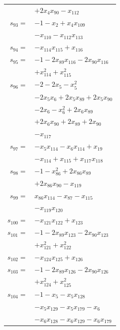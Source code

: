 \begin{longtable}{@{}r@{\;}l@{}}
 & \(\displaystyle +2x_{4}x_{90} -x_{112}\) \\[3pt]
\(s_{93}=\) & \(\displaystyle -1 -x_{2} +x_{4}x_{109}\) \\
 & \(\displaystyle -x_{110} -x_{112}x_{113}\) \\[3pt]
\(s_{94}=\) & \(\displaystyle -x_{114}x_{115} +x_{116}\) \\[3pt]
\(s_{95}=\) & \(\displaystyle -1 -2x_{89}x_{116} -2x_{90}x_{116}\) \\
 & \(\displaystyle +x_{114}^{2} +x_{115}^{2}\) \\[3pt]
\(s_{96}=\) & \(\displaystyle -2 -2x_{5} -x_{5}^{2}\) \\
 & \(\displaystyle -2x_{5}x_{6} +2x_{5}x_{89} +2x_{5}x_{90}\) \\
 & \(\displaystyle -2x_{6} -x_{6}^{2} +2x_{6}x_{89}\) \\
 & \(\displaystyle +2x_{6}x_{90} +2x_{89} +2x_{90}\) \\
 & \(\displaystyle -x_{117}\) \\[3pt]
\(s_{97}=\) & \(\displaystyle -x_{5}x_{114} -x_{6}x_{114} +x_{19}\) \\
 & \(\displaystyle -x_{114} +x_{115} +x_{117}x_{118}\) \\[3pt]
\(s_{98}=\) & \(\displaystyle -1 -x_{86}^{2} +2x_{86}x_{89}\) \\
 & \(\displaystyle +2x_{86}x_{90} -x_{119}\) \\[3pt]
\(s_{99}=\) & \(\displaystyle x_{86}x_{114} -x_{87} -x_{115}\) \\
 & \(\displaystyle -x_{119}x_{120}\) \\[3pt]
\(s_{100}=\) & \(\displaystyle -x_{121}x_{122} +x_{123}\) \\[3pt]
\(s_{101}=\) & \(\displaystyle -1 -2x_{89}x_{123} -2x_{90}x_{123}\) \\
 & \(\displaystyle +x_{121}^{2} +x_{122}^{2}\) \\[3pt]
\(s_{102}=\) & \(\displaystyle -x_{124}x_{125} +x_{126}\) \\[3pt]
\(s_{103}=\) & \(\displaystyle -1 -2x_{89}x_{126} -2x_{90}x_{126}\) \\
 & \(\displaystyle +x_{124}^{2} +x_{125}^{2}\) \\[3pt]
\(s_{104}=\) & \(\displaystyle -1 -x_{5} -x_{5}x_{128}\) \\
 & \(\displaystyle -x_{5}x_{129} -x_{5}x_{179} -x_{6}\) \\
 & \(\displaystyle -x_{6}x_{128} -x_{6}x_{129} -x_{6}x_{179}\) \\

\end{longtable}
